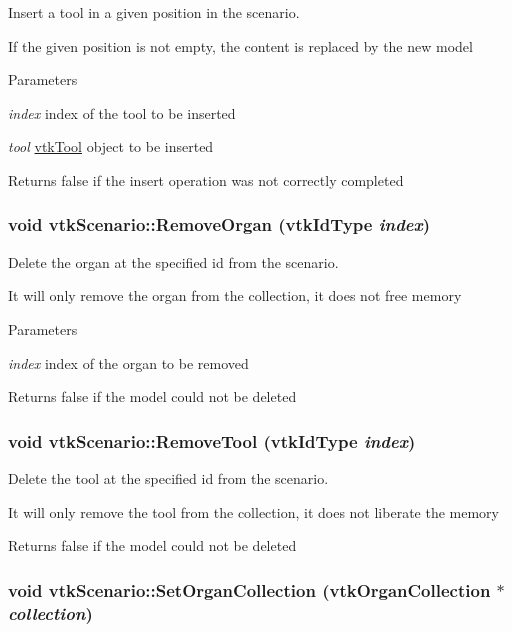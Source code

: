 Insert a tool in a given position in the scenario. 

If the given position is not empty, the content is replaced by the new model 
\begin{DoxyParams}{Parameters}
\item[{\em index}]index of the tool to be inserted \item[{\em tool}]\hyperlink{classvtkTool}{vtkTool} object to be inserted \end{DoxyParams}
\begin{DoxyReturn}{Returns}
false if the insert operation was not correctly completed 
\end{DoxyReturn}
\hypertarget{classvtkScenario_a8b78726133ade77ee874c0e9c4f8028a}{
\subsubsection[{RemoveOrgan}]{\setlength{\rightskip}{0pt plus 5cm}void vtkScenario::RemoveOrgan (vtkIdType {\em index})}}
\label{classvtkScenario_a8b78726133ade77ee874c0e9c4f8028a}


Delete the organ at the specified id from the scenario. 

It will only remove the organ from the collection, it does not free memory 
\begin{DoxyParams}{Parameters}
\item[{\em index}]index of the organ to be removed \end{DoxyParams}
\begin{DoxyReturn}{Returns}
false if the model could not be deleted 
\end{DoxyReturn}
\hypertarget{classvtkScenario_a720fbda74cc08ba3fe2929945a07ba83}{
\subsubsection[{RemoveTool}]{\setlength{\rightskip}{0pt plus 5cm}void vtkScenario::RemoveTool (vtkIdType {\em index})}}
\label{classvtkScenario_a720fbda74cc08ba3fe2929945a07ba83}


Delete the tool at the specified id from the scenario. 

It will only remove the tool from the collection, it does not liberate the memory \begin{DoxyReturn}{Returns}
false if the model could not be deleted 
\end{DoxyReturn}
\hypertarget{classvtkScenario_afff48d5fa445019c74d0ae9b6cc42376}{
\subsubsection[{SetOrganCollection}]{\setlength{\rightskip}{0pt plus 5cm}void vtkScenario::SetOrganCollection ({\bf vtkOrganCollection} $\ast$ {\em collection})}}
\label{classvtkScenario_afff48d5fa445019c74d0ae9b6cc42376}


